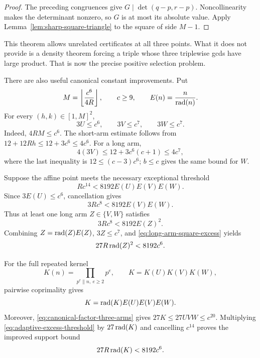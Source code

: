 \begin{proof}
The preceding congruences give
$G\mid\det(q-p,r-p)$.  Noncollinearity makes the determinant nonzero, so
$G$ is at most its absolute value.  Apply
Lemma~\ref{lem:sharp-square-triangle} to the square of side $M-1$.
\end{proof}

This theorem allows unrelated certificates at all three points.  What it
does not provide is a density theorem forcing a triple whose three
triplewise gcds have large product.  That is now the precise positive
selection problem.

There are also useful canonical constant improvements.  Put
\[
 M=\left\lfloor\frac{c^6}{4R}\right\rfloor,\qquad c\ge9,
 \qquad E(n)=\frac n{\operatorname{rad}(n)}.
\]
For every $(h,k)\in[1,M]^2$,
\begin{equation}\label{eq:canonical-factor-three-arms}
                 3U\le c^6,\qquad 3V\le c^7,\qquad 3W\le c^7.
\end{equation}
Indeed, $4RM\le c^6$.  The short-arm estimate follows from
$12+12Rh\le12+3c^6\le4c^6$.  For a long arm,
\[
 4(3V)\le12+3c^6(c+1)\le4c^7,
\]
where the last inequality is $12\le(c-3)c^6$; $b\le c$ gives the same
bound for $W$.

Suppose the affine point meets the necessary exceptional threshold
\begin{equation}\label{eq:adaptive-excess-threshold}
              Rc^{14}<8192E(U)E(V)E(W).
\end{equation}
Since $3E(U)\le c^6$, cancellation gives
\[
                   3Rc^8<8192E(V)E(W).
\]
Thus at least one long arm $Z\in\{V,W\}$ satisfies
\begin{equation}\label{eq:long-arm-square-excess}
                   3Rc^8<8192E(Z)^2.
\end{equation}
Combining $Z=\operatorname{rad}(Z)E(Z)$, $3Z\le c^7$, and
\eqref{eq:long-arm-square-excess} yields
\begin{equation}\label{eq:long-arm-radical-square-support}
             27R\operatorname{rad}(Z)^2<8192c^6.
\end{equation}

For the full repeated kernel
\[
 K(n)=\prod_{p^e\parallel n,\ e\ge2}p^e,\qquad
 K=K(U)K(V)K(W),
\]
pairwise coprimality gives
\[
 K=\operatorname{rad}(K)E(U)E(V)E(W).
\]
Moreover, \eqref{eq:canonical-factor-three-arms} gives
$27K\le27UVW\le c^{20}$.  Multiplying
\eqref{eq:adaptive-excess-threshold} by $27\operatorname{rad}(K)$ and cancelling
$c^{14}$ proves the improved support bound
\begin{equation}\label{eq:full-kernel-factor-27-support}
                 27R\operatorname{rad}(K)<8192c^6.
\end{equation}

